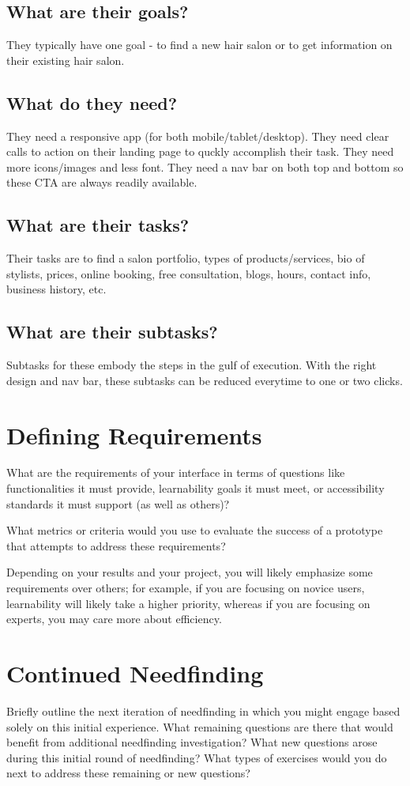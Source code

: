 \subsection{What are their goals?}
They typically have one goal - to find a new hair salon or to get information on their existing hair salon.

\subsection{What do they need?}
They need a responsive app (for both mobile/tablet/desktop). They need clear calls to action on their landing page to quckly accomplish their task. They need more icons/images and less font. They need a nav bar on both top and bottom so these CTA are always readily available.

\subsection{What are their tasks?}
Their tasks are to find a salon portfolio, types of products/services, bio of stylists, prices, online booking, free consultation, blogs, hours, contact info, business history, etc.

\subsection{What are their subtasks?}
Subtasks for these embody the steps in the gulf of execution. With the right design and nav bar, these subtasks can be reduced everytime to one or two clicks.


\section{Defining Requirements}
What are the requirements of your interface in terms of questions like functionalities it must provide, learnability goals it must meet, or accessibility standards it must support (as well as others)?

What metrics or criteria would you use to evaluate the success of a prototype that attempts to address these requirements?

Depending on your results and your project, you will likely emphasize some requirements over others; for example, if you are focusing on novice users, learnability will likely take a higher priority, whereas if you are focusing on experts, you may care more about efficiency.


\section{Continued Needfinding}
Briefly outline the next iteration of needfinding in which you might engage based solely on this initial experience. What remaining questions are there that would benefit from additional needfinding investigation? What new questions arose during this initial round of needfinding? What types of exercises would you do next to address these remaining or new questions?



